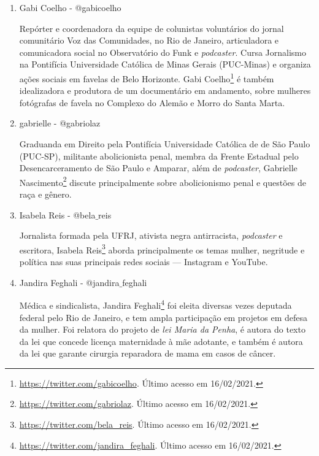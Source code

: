 \documentclass[
	12pt,				%
	openright,			%
	twoside,			%
	a4paper,			%
	english,			%
	brazil				%
	]{abntex2}
\begin{document}
\begin{anexosenv}
\begin{enumerate}
 Jornalista, colunista do jornal O Globo e da CBN, comentarista do GloboNews e \textit{podcaster}, Flávia Oliveira\footnote{\url{https://twitter.com/flaviaol}. Último acesso em 16/02/2021.} é ativista feminista negra, e mãe da também ativista Isabela Reis (ver \ref{belareis}).

 \item Gabi Coelho - @gabicoelho
 
 Repórter e coordenadora da equipe de colunistas voluntários do jornal comunitário Voz das Comunidades, no Rio de Janeiro, articuladora e comunicadora social no Observatório do Funk e \textit{podcaster}. Cursa Jornalismo na Pontifícia Universidade Católica de Minas Gerais (PUC-Minas) e organiza ações sociais em favelas de Belo Horizonte. Gabi Coelho\footnote{\url{https://twitter.com/gabicoelho}. Último acesso em 16/02/2021.} é também idealizadora e produtora de um documentário em andamento, sobre mulheres fotógrafas de favela no Complexo do Alemão e Morro do Santa Marta.

 \item gabrielle - @gabriolaz
 
 Graduanda em Direito pela Pontifícia Universidade Católica de de São Paulo (PUC-SP), militante abolicionista penal, membra da Frente Estadual pelo Desencarceramento de São Paulo e Amparar, além de \textit{podcaster}, Gabrielle Nascimento\footnote{\url{https://twitter.com/gabriolaz}. Último acesso em 16/02/2021.} discute principalmente sobre abolicionismo penal e questões de raça e gênero.

 \item Isabela Reis - @bela$\_$reis\label{belareis}
 
 Jornalista formada pela UFRJ, ativista negra antirracista, \textit{podcaster} e escritora, Isabela Reis\footnote{\url{https://twitter.com/bela_reis}. Último acesso em 16/02/2021.} aborda principalmente os temas mulher, negritude e política nas suas principais redes sociais --- Instagram e YouTube.
 
 \item Jandira Feghali - @jandira$\_$feghali
 
 Médica e sindicalista, Jandira Feghali\footnote{\url{https://twitter.com/jandira_feghali}. Último acesso em 16/02/2021.} foi eleita diversas vezes deputada federal pelo Rio de Janeiro, e tem ampla participação em projetos em defesa da mulher. Foi relatora do projeto de \textit{lei Maria da Penha}, é autora do texto da lei que concede licença maternidade à mãe adotante, e também é autora da lei que garante cirurgia reparadora de mama em casos de câncer.


\end{enumerate}
\end{anexosenv}
\end{document}
